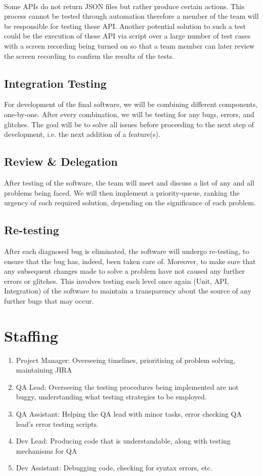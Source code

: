 \documentclass[a4paper, 11pt]{article}
\begin{document}
\paragraph{}
Some APIs do not return JSON files but rather produce certain actions. This process cannot be tested through automation therefore a member of the team will be responsible for testing these API. Another potential solution to such a test could be the execution of these API via script over a large number of test cases with a screen recording being turned on so that a team member can later review the screen recording to confirm the results of the tests.

\subsection{Integration Testing}
For development of the final software, we will be combining different components, one-by-one. After every combination, we will be testing for any bugs, errors, and glitches. The goal will be to solve all issues before proceeding to the next step of development, i.e. the next addition of a feature(s).

\subsection{Review \& Delegation}
After testing of the software, the team will meet and discuss a list of any and all problems being faced. We will then implement a priority-queue, ranking the urgency of each required solution, depending on the significance of each problem.

\subsection{Re-testing}
After each diagnosed bug is eliminated, the software will undergo re-testing, to ensure that the bug has, indeed, been taken care of. Moreover, to make sure that any subsequent changes made to solve a problem have not caused any further errors or glitches. This involves testing each level once again (Unit, API, Integration) of the software to maintain a transparency about the source of any further bugs that may occur. 
\section{Staffing}
\begin{enumerate}
    \item Project Manager: Overseeing timelines, prioritising of problem solving, maintaining JIRA
    \item QA Lead: Overseeing the testing procedures being implemented are not buggy, understanding what testing strategies to be employed.
    \item QA Assistant: Helping the QA lead with minor tasks, error checking QA lead's error testing scripts. 
    \item Dev Lead: Producing code that is understandable, along with testing mechanisms for QA
    \item Dev Assistant: Debugging code, checking for syntax errors, etc.
\end{enumerate}
\end{document}
